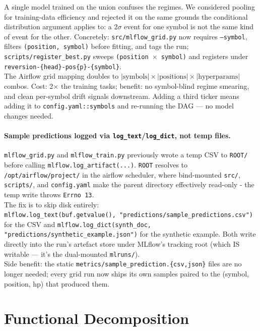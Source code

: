 \documentclass[11pt,a4paper]{article}
\begin{document}
A single model trained on the union confuses the regimes. We considered pooling for training-data efficiency and rejected it on the same grounds the conditional distribution argument applies to: a $2\sigma$ event for one symbol is not the same kind of event for the other. Concretely: \texttt{src/mlflow\_grid.py} now requires \texttt{--symbol}, filters \texttt{(position, symbol)} before fitting, and tags the run; \texttt{scripts/register\_best.py} sweeps \texttt{(position $\times$ symbol)} and registers under
\\
\texttt{reversion-\{head\}-pos\{p\}-\{symbol\}}. 
\\
The Airflow grid mapping doubles to $|\text{symbols}| \times |\text{positions}| \times |\text{hyperparams}|$ combos. Cost: 2$\times$ the training tasks; benefit: no symbol-blind regime smearing, and clean per-symbol drift signals downstream. Adding a third ticker means adding it to \texttt{config.yaml::symbols} and re-running the DAG --- no model changes needed.

\paragraph{Sample predictions logged via \texttt{log\_text}/\texttt{log\_dict}, not temp files.}
\texttt{mlflow\_grid.py} and \texttt{mlflow\_train.py} previously wrote a temp CSV to \texttt{ROOT/} before calling \texttt{mlflow.log\_artifact(...)}. \texttt{ROOT} resolves to \texttt{/opt/airflow/project/} in the airflow scheduler, where bind-mounted \texttt{src/}, \texttt{scripts/}, and \texttt{config.yaml} make the parent directory effectively read-only - the temp write throws \texttt{Errno 13}. 
\\
The fix is to skip disk entirely: 
\\
\texttt{mlflow.log\_text(buf.getvalue(), "predictions/sample\_predictions.csv")} for the CSV and \texttt{mlflow.log\_dict(synth\_doc, "predictions/synthetic\_example.json")} for the synthetic example. Both write directly into the run's artefact store under MLflow's tracking root (which IS writable --- it's the dual-mounted \texttt{mlruns/}). 
\\
Side benefit: the static \texttt{metrics/sample\_prediction.\{csv,json\}} files are no longer needed; every grid run now ships its own samples paired to the (symbol, position, hp) that produced them.

\section{Functional Decomposition}
\end{document}
